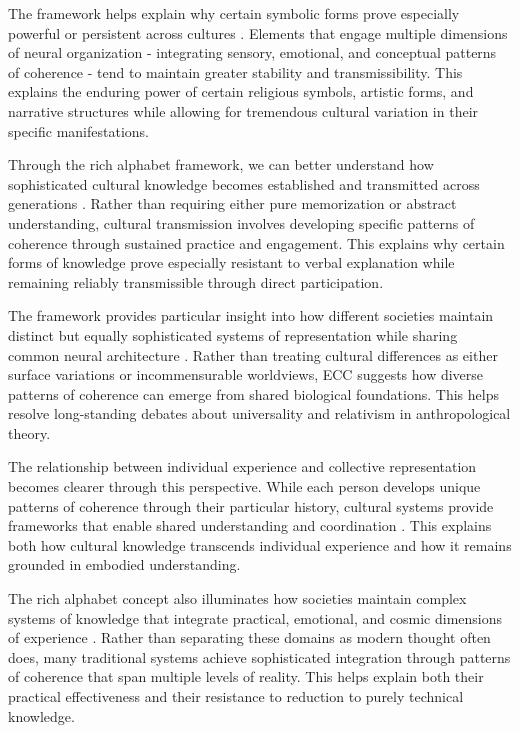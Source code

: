 The framework helps explain why certain symbolic forms prove especially powerful or persistent across cultures \cite{armstrong1981powers}. Elements that engage multiple dimensions of neural organization - integrating sensory, emotional, and conceptual patterns of coherence - tend to maintain greater stability and transmissibility. This explains the enduring power of certain religious symbols, artistic forms, and narrative structures while allowing for tremendous cultural variation in their specific manifestations.

Through the rich alphabet framework, we can better understand how sophisticated cultural knowledge becomes established and transmitted across generations \cite{whitehouse2004modes}. Rather than requiring either pure memorization or abstract understanding, cultural transmission involves developing specific patterns of coherence through sustained practice and engagement. This explains why certain forms of knowledge prove especially resistant to verbal explanation while remaining reliably transmissible through direct participation.

The framework provides particular insight into how different societies maintain distinct but equally sophisticated systems of representation while sharing common neural architecture \cite{bateson1972steps}. Rather than treating cultural differences as either surface variations or incommensurable worldviews, ECC suggests how diverse patterns of coherence can emerge from shared biological foundations. This helps resolve long-standing debates about universality and relativism in anthropological theory.

The relationship between individual experience and collective representation becomes clearer through this perspective. While each person develops unique patterns of coherence through their particular history, cultural systems provide frameworks that enable shared understanding and coordination \cite{shore1996culture}. This explains both how cultural knowledge transcends individual experience and how it remains grounded in embodied understanding.

The rich alphabet concept also illuminates how societies maintain complex systems of knowledge that integrate practical, emotional, and cosmic dimensions of experience \cite{wagner1981invention}. Rather than separating these domains as modern thought often does, many traditional systems achieve sophisticated integration through patterns of coherence that span multiple levels of reality. This helps explain both their practical effectiveness and their resistance to reduction to purely technical knowledge.

